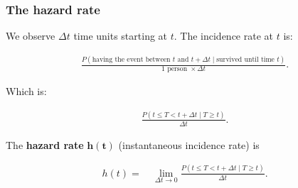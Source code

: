 \documentclass[10pt,t]{beamer}
\begin{document}
\begin{frame}
\frametitle{The hazard rate}

\vspace{-5 mm}

We observe $\Delta t$ time units starting at $t$. The incidence rate at $t$ is:
\smallskip
\color{blue}

\begin{align*}
 \frac{P(\text{having the event between }t\text{ and }t+\Delta t \mid \text{survived until time }t )}{1\text{ person }\times\Delta t}.
\end{align*}

\medskip
\color{black}


Which is:
\smallskip

\color{blue}
\begin{align*}
\frac{P(t \leq T < t + \Delta t \mid T \geq t)}{\Delta t}.
\end{align*}

\medskip

\color{black}

The \textbf{hazard rate} $\mathbf{h(t)}$ (instantaneous incidence rate) is

\smallskip
\color{blue}
\begin{align*}
h(t) = & \ \lim_{\Delta t \to 0} \frac{P(t \leq T < t + \Delta t \mid T \geq t)}{\Delta t}.
\end{align*} 

\end{frame}
 
\end{document}
